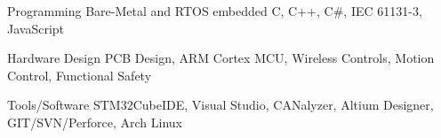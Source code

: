 


\begin{cvskills}


    \cvskill
    {Programming} %
    {Bare-Metal and RTOS embedded C, C++, C\#, IEC 61131-3, JavaScript} %

    \cvskill
    {Hardware Design} %
    {PCB Design, ARM Cortex MCU, Wireless Controls, Motion Control, Functional Safety} %


    \cvskill
    {Tools/Software} %
    {STM32CubeIDE, Visual Studio, CANalyzer, Altium Designer, GIT/SVN/Perforce, Arch Linux} %


\end{cvskills}